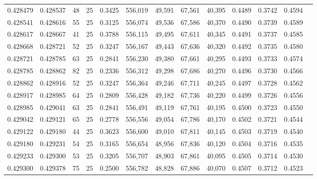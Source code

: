 \begin{tabular}{rrrrrrrrrrrrr}
0.428479 & 0.428537 &    48 &  25 &                                     0.3425 & 556,019 &  49,591 &  67,561 &  40,395 & 0.4489 & 0.3742 & 0.4594 \\
0.428541 & 0.428616 &    55 &  25 &                                     0.3125 & 556,074 &  49,536 &  67,586 &  40,370 & 0.4490 & 0.3739 & 0.4589 \\
0.428617 & 0.428667 &    41 &  25 &                                     0.3788 & 556,115 &  49,495 &  67,611 &  40,345 & 0.4491 & 0.3737 & 0.4585 \\
0.428668 & 0.428721 &    52 &  25 &                                     0.3247 & 556,167 &  49,443 &  67,636 &  40,320 & 0.4492 & 0.3735 & 0.4580 \\
0.428721 & 0.428785 &    63 &  25 &                                     0.2841 & 556,230 &  49,380 &  67,661 &  40,295 & 0.4493 & 0.3733 & 0.4574 \\
0.428785 & 0.428862 &    82 &  25 &                                     0.2336 & 556,312 &  49,298 &  67,686 &  40,270 & 0.4496 & 0.3730 & 0.4566 \\
0.428862 & 0.428916 &    52 &  25 &                                     0.3247 & 556,364 &  49,246 &  67,711 &  40,245 & 0.4497 & 0.3728 & 0.4562 \\
0.428917 & 0.428985 &    64 &  25 &                                     0.2809 & 556,428 &  49,182 &  67,736 &  40,220 & 0.4499 & 0.3726 & 0.4556 \\
0.428985 & 0.429041 &    63 &  25 &                                     0.2841 & 556,491 &  49,119 &  67,761 &  40,195 & 0.4500 & 0.3723 & 0.4550 \\
0.429042 & 0.429121 &    65 &  25 &                                     0.2778 & 556,556 &  49,054 &  67,786 &  40,170 & 0.4502 & 0.3721 & 0.4544 \\
0.429122 & 0.429180 &    44 &  25 &                                     0.3623 & 556,600 &  49,010 &  67,811 &  40,145 & 0.4503 & 0.3719 & 0.4540 \\
0.429180 & 0.429231 &    54 &  25 &                                     0.3165 & 556,654 &  48,956 &  67,836 &  40,120 & 0.4504 & 0.3716 & 0.4535 \\
0.429233 & 0.429300 &    53 &  25 &                                     0.3205 & 556,707 &  48,903 &  67,861 &  40,095 & 0.4505 & 0.3714 & 0.4530 \\
0.429300 & 0.429378 &    75 &  25 &                                     0.2500 & 556,782 &  48,828 &  67,886 &  40,070 & 0.4507 & 0.3712 & 0.4523 \\

\end{tabular}
